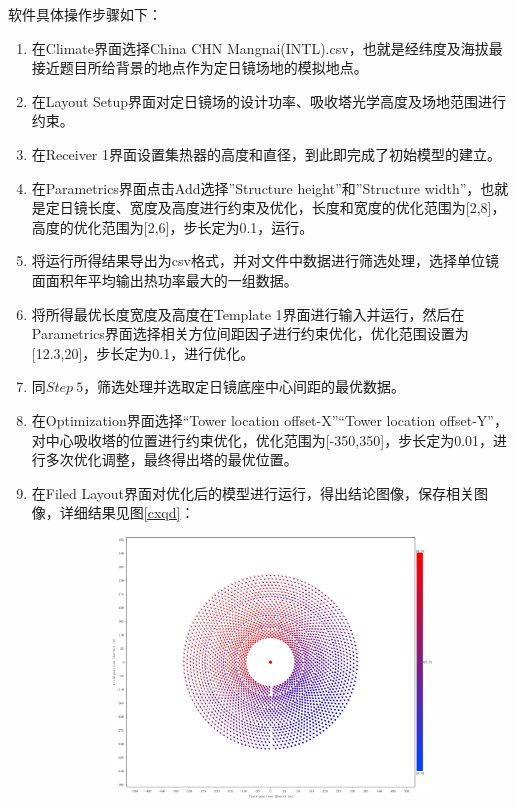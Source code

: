 \documentclass[withoutpreface,bwprint]{cumcmthesis} %
\begin{document}
软件具体操作步骤如下：
\begin{enumerate}[label=$Step$ \arabic*:, leftmargin=*]
\item 在Climate界面选择China CHN Mangnai(INTL).csv，也就是经纬度及海拔最接近题目所给背景的地点作为定日镜场地的模拟地点。
\item 在Layout Setup界面对定日镜场的设计功率、吸收塔光学高度及场地范围进行约束。
\item 在Receiver 1界面设置集热器的高度和直径，到此即完成了初始模型的建立。
\item 在Parametrics界面点击Add选择”Structure height”和”Structure width”，也就是定日镜长度、宽度及高度进行约束及优化，长度和宽度的优化范围为[2,8]，高度的优化范围为[2,6]，步长定为0.1，运行。
\item 将运行所得结果导出为csv格式，并对文件中数据进行筛选处理，选择单位镜面面积年平均输出热功率最大的一组数据。
\item 将所得最优长度宽度及高度在Template 1界面进行输入并运行，然后在Parametrics界面选择相关方位间距因子进行约束优化，优化范围设置为[12.3,20]，步长定为0.1，进行优化。
\item 同$Step \  5$，筛选处理并选取定日镜底座中心间距的最优数据。
\item 在Optimization界面选择“Tower location offset-X”“Tower location offset-Y”，对中心吸收塔的位置进行约束优化，优化范围为[-350,350]，步长定为0.01，进行多次优化调整，最终得出塔的最优位置。
\item 在Filed Layout界面对优化后的模型进行运行，得出结论图像，保存相关图像，详细结果见图\ref{cxqd}：
\begin{figure}[htbp]
\centering
\begin{subfigure}[b]{.49\textwidth}
\includegraphics[width=\textwidth]{figures/2682春分.png}

\end{subfigure}
\end{figure}
\end{enumerate}
\end{document}
